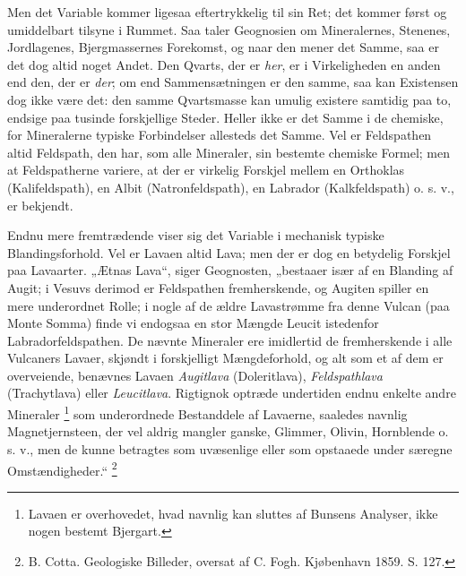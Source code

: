 \documentclass[12pt,a4paper]{book}
\renewcommand{\thefootnote}{*)}
\begin{document}
Men det Variable kommer ligesaa eftertrykkelig til sin Ret; det kommer
først og umiddelbart tilsyne i Rummet. Saa taler Geognosien om
Mineralernes, Stenenes, Jordlagenes, Bjergmassernes Forekomst, og
naar den mener det Samme, saa er det dog altid noget Andet. Den Qvarts,
der er \emph{her}, er i Virkeligheden en anden end den, der er
\emph{der}; om end Sammensætningen er den samme, saa kan Existensen dog
ikke være det: den samme Qvartsmasse kan umulig existere samtidig paa to,
endsige paa tusinde forskjellige Steder. Heller ikke er det Samme i de
chemiske, for Mineralerne typiske Forbindelser allesteds det Samme. Vel
er Feldspathen altid Feldspath, den har, som alle Mineraler, sin bestemte
chemiske Formel; men at Feldspatherne variere, at der er virkelig Forskjel
mellem en Orthoklas (Kalifeldspath), en Albit (Natronfeldspath), en
Labrador (Kalkfeldspath) o. s. v., er bekjendt.

Endnu mere fremtrædende viser sig det Variable i mechanisk typiske
Blandingsforhold. Vel er Lavaen altid Lava; men der er dog en betydelig
Forskjel paa Lavaarter. „Ætnas Lava“, siger Geognosten, „bestaaer især af
en Blanding af Augit; i Vesuvs derimod er Feldspathen fremherskende, og
Augiten spiller en mere underordnet Rolle; i nogle af de ældre
Lavastrømme fra denne Vulcan (paa Monte Somma) finde vi endogsaa en stor
Mængde Leucit
istedenfor Labradorfeldspathen. De nævnte Mineraler ere imidlertid de
fremherskende i alle Vulcaners Lavaer, skjøndt i forskjelligt
Mængdeforhold, og alt som et af dem er overveiende, benævnes Lavaen
\emph{Augitlava} (Doleritlava), \emph{Feldspathlava} (Trachytlava) eller
\emph{Leucitlava}. Rigtignok optræde undertiden endnu enkelte andre
Mineraler%
\footnote{%
Lavaen er overhovedet, hvad navnlig kan sluttes af Bunsens Analyser, ikke
nogen bestemt Bjergart.}
som underordnede Bestanddele af Lavaerne, saaledes navnlig
Magnetjernsteen, der vel aldrig mangler ganske, Glimmer, Olivin,
Hornblende o. s. v., men de kunne betragtes som uvæsenlige eller som
opstaaede under særegne Omstændigheder.“%
\renewcommand{\thefootnote}{**)}%
\footnote{%
B. Cotta. Geologiske Billeder, oversat af C. Fogh. Kjøbenhavn 1859.
S. 127.}%
\renewcommand{\thefootnote}{*)}
\end{document}
